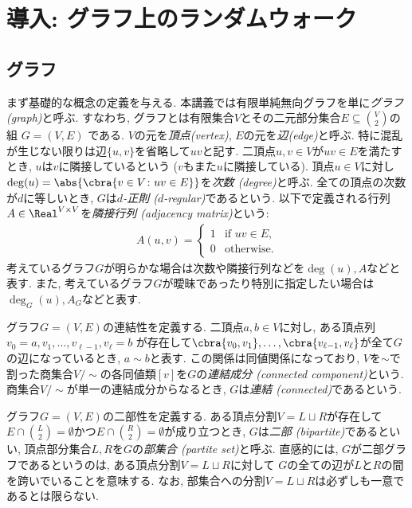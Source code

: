 \section{導入: グラフ上のランダムウォーク}
\subsection{グラフ}
まず基礎的な概念の定義を与える.
本講義では有限単純無向グラフを単に\emph{グラフ (graph)}と呼ぶ.
すなわち, グラフとは有限集合$V$とその二元部分集合$E\subseteq \binom{V}{2}$の組 $G = (V, E)$ である.
$V$の元を\emph{頂点(vertex)}, $E$の元を\emph{辺(edge)}と呼ぶ.
特に混乱が生じない限りは辺$\{u,v\}$を省略して$uv$と記す.
二頂点$u,v\in V$が$uv\in E$を満たすとき, $u$は$v$に隣接しているという ($v$もまた$u$に隣接している).
頂点$u\in V$に対し$\deg(u) = \abs{\cbra{v \in V \colon uv\in E}}$を\emph{次数 (degree)}と呼ぶ.
全ての頂点の次数が$d$に等しいとき, $G$は\emph{$d$-正則 ($d$-regular)}であるという.
以下で定義される行列$A \in \Real^{V\times V}$を\emph{隣接行列 (adjacency matrix)}という:
\begin{align*}
  A(u,v) = \begin{cases}
    1	& \text{if }uv\in E,\\
    0 & \text{otherwise}.
  \end{cases}
\end{align*}
考えているグラフ$G$が明らかな場合は次数や隣接行列などを$\deg(u),A$などと表す.
また, 考えているグラフ$G$が曖昧であったり特別に指定したい場合は$\deg_G(u),A_G$などと表す.

グラフ$G=(V,E)$の連結性を定義する.
二頂点$a,b\in V$に対し,
  ある頂点列$v_0=a,v_1,\dots,v_{\ell-1},v_\ell = b$
  が存在して$\cbra{v_0,v_1},\dots,\cbra{v_{\ell-1},v_\ell}$が全て$G$の辺になっているとき,
  $a\sim b$と表す.
この関係は同値関係になっており, $V$を$\sim$で割った商集合$V / \sim$の各同値類$[v]$を$G$の\emph{連結成分 (connected component)}という.
商集合$V / \sim$が単一の連結成分からなるとき, $G$は\emph{連結 (connected)}であるという.

グラフ$G=(V,E)$の二部性を定義する.
ある頂点分割$V=L\sqcup R$が存在して$E\cap \binom{L}{2}=\emptyset$かつ$E\cap \binom{R}{2}=\emptyset$が成り立つとき, $G$は\emph{二部 (bipartite)}であるといい,
頂点部分集合$L,R$を$G$の\emph{部集合 (partite set)}と呼ぶ.
直感的には, $G$が二部グラフであるというのは, ある頂点分割$V=L\sqcup R$に対して
$G$の全ての辺が$L$と$R$の間を跨いでいることを意味する.
なお, 部集合への分割$V = L\sqcup R$は必ずしも一意であるとは限らない.

